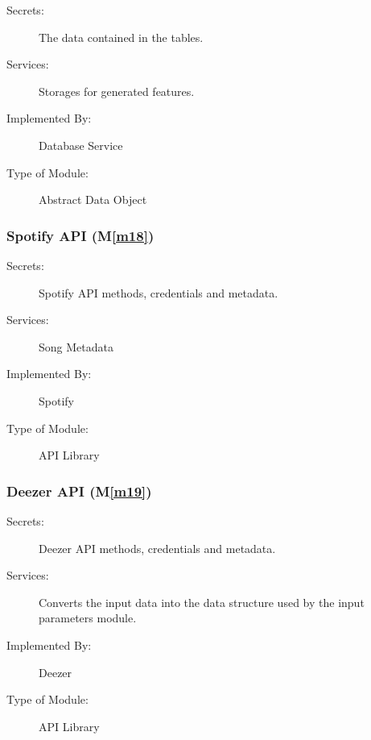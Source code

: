\documentclass[12pt, titlepage]{article}
\newcommand{\mref}[1]{M\ref{#1}}
\begin{document}
\begin{description}
\item[Secrets:] The data contained in the tables. 
\item[Services:] Storages for generated features. 
\item[Implemented By:] Database Service
\item[Type of Module:] Abstract Data Object
\end{description}



\subsubsection{Spotify API (\mref{m18})}

\begin{description}
\item[Secrets:]Spotify API methods, credentials and metadata. 
\item[Services:]Song Metadata
\item[Implemented By:] Spotify
\item[Type of Module:] API Library
\end{description}

\subsubsection{Deezer API (\mref{m19})}

\begin{description}
\item[Secrets:]Deezer API methods, credentials and metadata. 
\item[Services:]Converts the input data into the data structure used by the
  input parameters module.
\item[Implemented By:] Deezer
\item[Type of Module:] API Library
\end{description}
\end{document}
